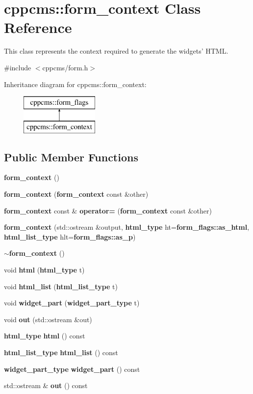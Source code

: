 \section{cppcms\-:\-:form\-\_\-context Class Reference}
\label{classcppcms_1_1form__context}


This class represents the context required to generate the widgets' H\-T\-M\-L.  




{\ttfamily \#include $<$cppcms/form.\-h$>$}

Inheritance diagram for cppcms\-:\-:form\-\_\-context\-:\begin{figure}[H]
\begin{center}
\leavevmode
\includegraphics[height=2.000000cm]{classcppcms_1_1form__context}
\end{center}
\end{figure}
\subsection*{Public Member Functions}
\begin{DoxyCompactItemize}
\item 
{\bf form\-\_\-context} ()
\item 
{\bf form\-\_\-context} ({\bf form\-\_\-context} const \&other)
\item 
{\bf form\-\_\-context} const \& {\bf operator=} ({\bf form\-\_\-context} const \&other)
\item 
{\bf form\-\_\-context} (std\-::ostream \&output, {\bf html\-\_\-type} ht={\bf form\-\_\-flags\-::as\-\_\-html}, {\bf html\-\_\-list\-\_\-type} hlt={\bf form\-\_\-flags\-::as\-\_\-p})
\item 
{\bf $\sim$form\-\_\-context} ()
\item 
void {\bf html} ({\bf html\-\_\-type} t)
\item 
void {\bf html\-\_\-list} ({\bf html\-\_\-list\-\_\-type} t)
\item 
void {\bf widget\-\_\-part} ({\bf widget\-\_\-part\-\_\-type} t)
\item 
void {\bf out} (std\-::ostream \&out)
\item 
{\bf html\-\_\-type} {\bf html} () const 
\item 
{\bf html\-\_\-list\-\_\-type} {\bf html\-\_\-list} () const 
\item 
{\bf widget\-\_\-part\-\_\-type} {\bf widget\-\_\-part} () const 
\item 
std\-::ostream \& {\bf out} () const 
\end{DoxyCompactItemize}
